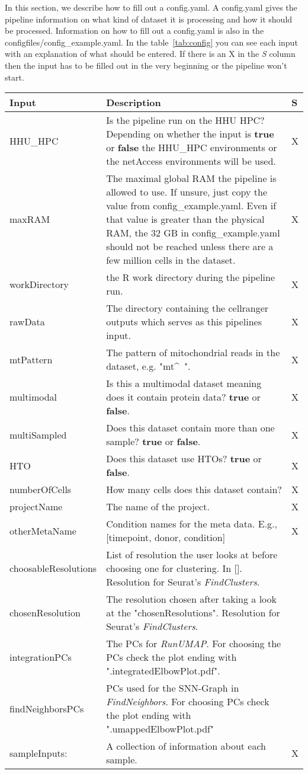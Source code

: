 In this section, we describe how to fill out a config.yaml. A config.yaml gives the pipeline information on what kind of dataset it is processing and how it should be processed. Information on how to fill out a config.yaml is also in the configfiles/config\_example.yaml. In the table~\ref{tab:config} you can see each input with an explanation of what should be entered. If there is an X in the \textit{S} column then the input has to be filled out in the very beginning or the pipeline won't start.

\begin{tabular}{p{3.5cm} | p{9.5cm} | p{0.1cm}}
	\label{tab:config}
	Input & Description & S\\
	\hline
	HHU\_HPC & Is the pipeline run on the HHU HPC? Depending on whether the input is \textbf{true} or \textbf{false} the HHU\_HPC environments or the netAccess environments will be used. & X\\
	maxRAM & The maximal global RAM the pipeline is allowed to use. If unsure, just copy the value from config\_example.yaml. Even if that value is greater than the physical RAM, the 32 GB in config\_example.yaml should not be reached unless there are a few million cells in the dataset. & X\\
	workDirectory & the R work directory during the pipeline run. & X\\
	rawData & The directory containing the cellranger outputs which serves as this pipelines input. & X\\
	mtPattern & The pattern of mitochondrial reads in the dataset, e.g. "mt\^~". & X\\
	multimodal & Is this a multimodal dataset meaning does it contain protein data? \textbf{true} or \textbf{false}. & X\\
	multiSampled & Does this dataset contain more than one sample? \textbf{true} or \textbf{false}. & X\\
	HTO & Does this dataset use HTOs? \textbf{true} or \textbf{false}. & X\\
	numberOfCells & How many cells does this dataset contain? & X\\
	projectName & The name of the project. & X\\
	otherMetaName & Condition names for the meta data. E.g., [timepoint, donor, condition] & X\\
	choosableResolutions & List of resolution the user looks at before choosing one for clustering. In []. Resolution for Seurat's \textit{FindClusters}. & \\
	chosenResolution & The resolution chosen after taking a look at the "chosenResolutions". Resolution for Seurat's \textit{FindClusters}. & \\
	integrationPCs & The PCs for \textit{RunUMAP}. For choosing the PCs check the plot ending with ".integratedElbowPlot.pdf". & \\
	findNeighborsPCs & PCs used for the SNN-Graph in \textit{FindNeighbors}. For choosing PCs check the plot ending with ".umappedElbowPlot.pdf" & \\
	sampleInputs: & A collection of information about each sample. & X\\
\end{tabular}

